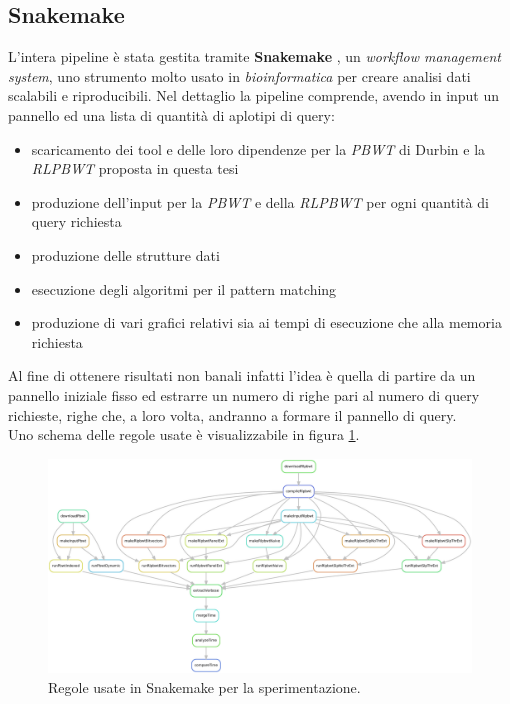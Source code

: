 \subsection{Snakemake}
L'intera pipeline è stata gestita tramite \textbf{Snakemake} \cite{snakemake},
un \textit{workflow management system}, uno strumento molto usato in
\textit{bioinformatica} per creare analisi dati scalabili e riproducibili. Nel
dettaglio la pipeline comprende, avendo in input un pannello ed una lista di
quantità di aplotipi di query:
\begin{itemize}
  \item scaricamento dei tool e delle loro dipendenze per la \textit{PBWT} di
  Durbin e la \textit{RLPBWT} proposta in questa tesi
  \item produzione dell'input per la \textit{PBWT} e della \textit{RLPBWT} per
  ogni quantità di query richiesta
  \item produzione delle strutture dati
  \item esecuzione degli algoritmi per il pattern matching
  \item produzione di vari grafici relativi sia ai tempi di esecuzione che alla
  memoria richiesta
\end{itemize}
Al fine di ottenere risultati non banali infatti l'idea è quella di partire da
un pannello iniziale fisso ed estrarre un numero di righe pari al numero di
query richieste, righe che, a loro volta, andranno a formare il pannello di
query.\\ 
Uno schema delle regole usate è visualizzabile in figura \ref{fig:snake}.
\begin{figure}
  \centering
  \includegraphics[width=\textwidth]{img/rules.pdf}
  \caption{Regole usate in Snakemake per la sperimentazione.}
  \label{fig:snake}
\end{figure}